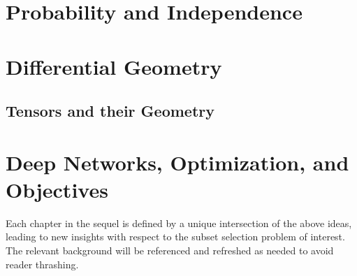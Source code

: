 \section{Probability and Independence}


\section{Differential Geometry}\label{sec:diffgeom}


\subsection{Tensors and their Geometry}


\section{Deep Networks, Optimization, and Objectives}


Each chapter in the sequel
is defined by a unique intersection
of the above ideas, leading to new insights
with respect to the subset selection problem of interest.
The relevant background will be referenced and refreshed 
as needed to avoid reader thrashing.